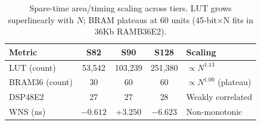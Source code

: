 \begin{table}[htbp]
\centering
\caption{Spare-time area/timing scaling across tiers.
LUT grows superlinearly with $N$; BRAM plateaus at 60 units (45-bit$\times$N fits in 36Kb RAMB36E2).}
\label{tab:scaling}
\footnotesize
\begin{tabular}{lcccl}
\toprule
Metric & S82 & S90 & S128 & Scaling \\
\midrule
LUT (count)     &  53,542 & 103,239 & 251,380 & $\propto N^{1.13}$ \\
BRAM36 (count)  &  30     &  60     &  60     & $\propto N^{1.00}$ (plateau) \\
DSP48E2         &  27     &  27     &  28     & Weakly correlated \\
WNS (ns)        & $-0.612$ & $+3.250$ & $-6.623$ & Non-monotonic \\
\bottomrule
\end{tabular}
\end{table}